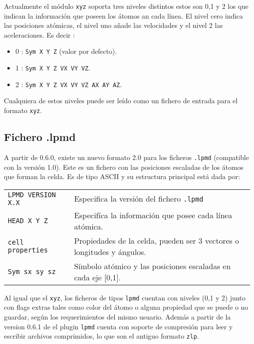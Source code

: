 Actualmente el m\'odulo \verb|xyz| soporta tres niveles distintos estos son 0,1 y 2 los que indican la informaci\'on que poseen los \'atomos an cada l\'inea. El nivel cero indica las posiciones at\'omicas, el nivel uno a\~nade las velocidades y el nivel 2 las aceleraciones. Es decir :

\begin{itemize}
\item 0 : \verb|Sym X Y Z| (valor por defecto).
\item 1 : \verb|Sym X Y Z VX VY VZ|.
\item 2 : \verb|Sym X Y Z VX VY VZ AX AY AZ|.
\end{itemize}

Cualquiera de estos niveles puede ser le\'ido como un fichero de entrada para el formato \verb|xyz|.

\subsection{Fichero .lpmd}

A partir de {\lpmd} 0.6.0, existe un nuevo formato 2.0 para los ficheros \verb|.lpmd| (compatible con la versi\'on 1.0). Este es un fichero con las posiciones escaladas de los \'atomos que forman la celda. Es de tipo ASCII y su estructura principal est\'a dada por:

\begin{center}
 \begin{tabular}{l|l}
 \verb|LPMD VERSION X.X | & Especifica la versi\'on del fichero \verb|.lpmd| \\
 \verb|HEAD X Y Z| & Especif\'ica la informaci\'on que posee cada l\'inea at\'omica. \\
 \verb|cell properties | & Propiedades de la celda, pueden ser 3 vectores o longitudes y \'angulos. \\
 \verb|Sym sx sy sz| & S\'imbolo at\'omico y las posiciones escaladas en cada eje [0,1].\\
\end{tabular}
\end{center}

Al igual que el \verb|xyz|, los ficheros de tipos \verb|lpmd| cuentan con niveles (0,1 y 2) junto con flags extras tales como color del \'atomo o alguna propiedad que se puede o no guardar, seg\'un los requerimientos del mismo usuario. Adem\'as a partir de la version 0.6.1 de {\lpmd} el plugin \verb|lpmd| cuenta con soporte de compresi\'on para leer y escribir archivos comprimidos, lo que son el antiguo formato \verb|zlp|.

